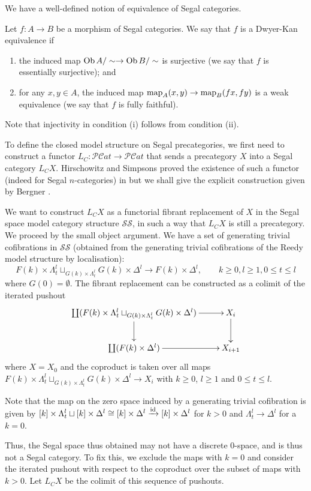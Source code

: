 \begin{refsection}
We have a well-defined notion of equivalence of Segal categories.
\begin{defin}
Let $f:A\to B$ be a morphism of Segal categories. We say that $f$ is a Dwyer-Kan equivalence if
\begin{enumerate}
\item the induced map $\operatorname{Ob} A/\sim\to\operatorname{Ob} B/\sim$ is surjective (we say that $f$ is essentially surjective); and
\item for any $x,y\in A$, the induced map $\operatorname{\mathrm{map}}_A(x,y)\to\operatorname{\mathrm{map}}_B(fx,fy)$ is a weak equivalence (we say that $f$ is fully faithful).
\end{enumerate}
\end{defin}
Note that injectivity in condition (i) follows from condition (ii).

To define the closed model structure on Segal precategories, we first need to construct a functor $L_C:\mathcal{PC}at\to\mathcal{PC}at$ that sends a precategory $X$ into a Segal category $L_CX$. Hirschowitz and Simpsons proved the existence of such a functor (indeed for Segal $n$-categories) in \cite{hs} but we shall give the explicit construction given by Bergner \cite{bergner2}.

We want to construct $L_CX$ as a functorial fibrant replacement of $X$ in the Segal space model category structure $\mathcal{SS}$, in such a way that $L_CX$ is still a precategory. We proceed by the small object argument. We have a set of generating trivial cofibrations in $\mathcal{SS}$ (obtained from the generating trivial cofibrations of the Reedy model structure by localisation):
$$F(k)\times\Lambda^l_t\sqcup_{G(k)\times\Lambda^l_t}G(k)\times\Delta^l\to F(k)\times\Delta^l,\qquad k\ge0,l\ge1,0\le t\le l$$
where $G(0)=\emptyset$. The fibrant replacement can be constructed as a colimit of the iterated pushout
$$\xymatrix{\coprod(F(k)\times\Lambda^l_t\sqcup_{G(k)\times\Lambda^l_t}G(k)\times\Delta^l)\ar[r]\ar[d]&X_i\ar[d]\\
\coprod(F(k)\times\Delta^l)\ar[r]&X_{i+1}}$$
where $X=X_0$ and the coproduct is taken over all maps $F(k)\times\Lambda^l_t\sqcup_{G(k)\times\Lambda^l_t}G(k)\times\Delta^l\to X_i$ with $k\ge 0$, $l\ge 1$ and $0\le t\le l$.

Note that the map on the zero space induced by a generating trivial cofibration is given by $[k]\times\Lambda^l_t\sqcup[k]\times\Delta^l\cong [k]\times\Delta^l\xrightarrow{\mathrm{id}}[k]\times\Delta^l$ for $k> 0$ and $\Lambda^l_t\to\Delta^l$ for a $k=0$.

Thus, the Segal space thus obtained may not have a discrete 0-space, and is thus not a Segal category. To fix this, we exclude the maps with $k=0$ and consider the iterated pushout with respect to the coproduct over the subset of maps with $k>0$. Let $L_CX$ be the colimit of this sequence of pushouts.


\end{refsection}
